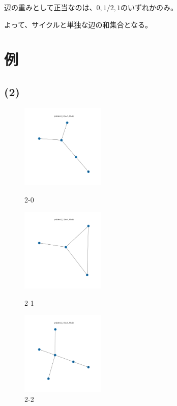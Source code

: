 \documentclass[a4paper, 10pt, dvipdfmx]{jlreq}
\begin{document}
辺の重みとして正当なのは、$0,1/2,1$のいずれかのみ。

よって、サイクルと単独な辺の和集合となる。

\section{例}

\subsection*{(2)}

\begin{figure}[htbp]
  \begin{minipage}{0.33\hsize}
    \begin{center}
      \includegraphics[width=40mm]{img_5/problem2_0.png}
    \end{center}
    \caption{2-0}
  \end{minipage}
  \begin{minipage}{0.33\hsize}
    \begin{center}
      \includegraphics[width=40mm]{img_5/problem2_1.png}
    \end{center}
    \caption{2-1}
  \end{minipage}
  \begin{minipage}{0.33\hsize}
    \begin{center}
      \includegraphics[width=40mm]{img_5/problem2_2.png}
    \end{center}
    \caption{2-2}
  \end{minipage}
\end{figure}
\end{document}
